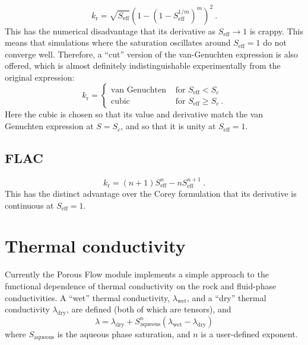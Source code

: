 \documentclass[12pt]{report}
\begin{document}
\begin{equation}
k_{\mathrm{r}} = \sqrt{S_{\mathrm{eff}}} \left(1 - (1 -
S_{\mathrm{eff}}^{1/m})^{m} \right)^{2} \ .
\end{equation}
This has the numerical disadvantage that its derivative as
$S_{\mathrm{eff}}\rightarrow 1$ is crappy.  This means that
simulations where the saturation oscillates around
$S_{\mathrm{eff}}=1$ do not converge well.  Therefore, a ``cut''
version of the van-Genuchten expression is also offered, which is
almost definitely indistinguishable experimentally from the original
expression:
\begin{equation}
k_{\mathrm{r}} = \left\{
\begin{array}{ll}
\mbox{van Genuchten} & \mbox{ for } S_{\mathrm{eff}} < S_{c} \\
\mbox{cubic} & \mbox{ for } S_{\mathrm{eff}} \geq S_{c} \ .
\end{array}
\right.
\end{equation}
Here the cubic is chosen so that its value and derivative match the
van Genuchten expression at $S=S_{c}$, and so that it is unity at
$S_{\mathrm{eff}}=1$.

\subsection{FLAC}

\begin{equation}
k_{\mathrm{r}} = (n + 1)S_{\mathrm{eff}}^{n} - n S_{\mathrm{eff}}^{n +
  1} \ .
\end{equation}
This has the distinct advantage over the Corey formulation that its
derivative is continuous at $S_{\mathrm{eff}}=1$.



\section{Thermal conductivity}

Currently the Porous Flow module implements a
simple approach to the functional dependence of thermal conductivity
on the rock and fluid-phase conductivities.  A ``wet'' thermal
conductivity, $\lambda_{\mathrm{wet}}$, and a ``dry'' thermal
conductivity $\lambda_{\mathrm{dry}}$, are defined (both of which are
tensors), and
\begin{equation}
  \lambda = \lambda_{\mathrm{dry}} + S_{\mathrm{aqueous}}^{n}
  (\lambda_{\mathrm{wet}}-\lambda_{\mathrm{dry}})
\end{equation}
where $S_{\mathrm{aqueous}}$ is the aqueous phase saturation, and $n$
is a user-defined exponent.
\end{document}
